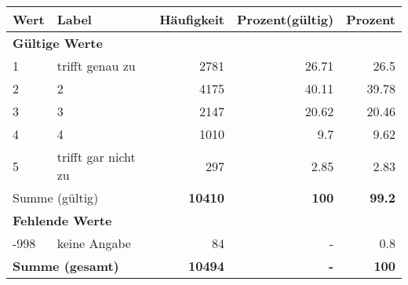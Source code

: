      \begin{longtable}{lXrrr}
     \toprule
     \textbf{Wert} & \textbf{Label} & \textbf{Häufigkeit} & \textbf{Prozent(gültig)} & \textbf{Prozent} \\
     \endhead
     \midrule
     \multicolumn{5}{l}{\textbf{Gültige Werte}}\\

     1 &
     \multicolumn{1}{X}{ trifft genau zu   } &


       \num{2781} &
       \num[round-mode=places,round-precision=2]{26.71} &
         \num[round-mode=places,round-precision=2]{26.5} \\

     2 &
     \multicolumn{1}{X}{ 2   } &


       \num{4175} &
       \num[round-mode=places,round-precision=2]{40.11} &
         \num[round-mode=places,round-precision=2]{39.78} \\

     3 &
     \multicolumn{1}{X}{ 3   } &


       \num{2147} &
       \num[round-mode=places,round-precision=2]{20.62} &
         \num[round-mode=places,round-precision=2]{20.46} \\

     4 &
     \multicolumn{1}{X}{ 4   } &


       \num{1010} &
       \num[round-mode=places,round-precision=2]{9.7} &
         \num[round-mode=places,round-precision=2]{9.62} \\

     5 &
     \multicolumn{1}{X}{ trifft gar nicht zu   } &


       \num{297} &
       \num[round-mode=places,round-precision=2]{2.85} &
         \num[round-mode=places,round-precision=2]{2.83} \\
     \midrule
     \multicolumn{2}{l}{Summe (gültig)} &
       \textbf{\num{10410}} &
     \textbf{\num{100}} &
       \textbf{\num[round-mode=places,round-precision=2]{99.2}} \\
     \multicolumn{5}{l}{\textbf{Fehlende Werte}}\\
       -998 &
       keine Angabe &
         \num{84} &
        - &
         \num[round-mode=places,round-precision=2]{0.8} \\
     \midrule
     \multicolumn{2}{l}{\textbf{Summe (gesamt)}} &
          \textbf{\num{10494}} &
        \textbf{-} &
        \textbf{\num{100}} \\
     \bottomrule
     \end{longtable}
     
